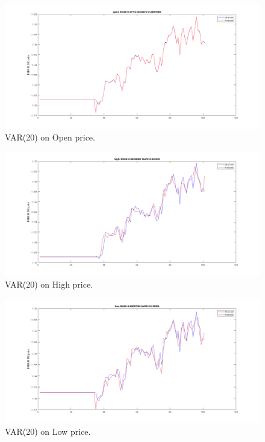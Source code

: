 \documentclass[11pt]{article}
\begin{document}
\begin{figure}[H]
  \centering
  \includegraphics[width=\textwidth,keepaspectratio]{figs/var20open100.png}
  \caption{VAR(20) on Open price.}
\end{figure}

\begin{figure}[H]
  \centering
  \includegraphics[width=\linewidth,keepaspectratio]{figs/var20high100.png}
  \caption{VAR(20) on High price.}
\end{figure}

\begin{figure}[H]
  \centering
  \includegraphics[width=\linewidth,keepaspectratio]{figs/var20low100.png}
  \caption{VAR(20) on Low price.}
\end{figure}
\end{document}
